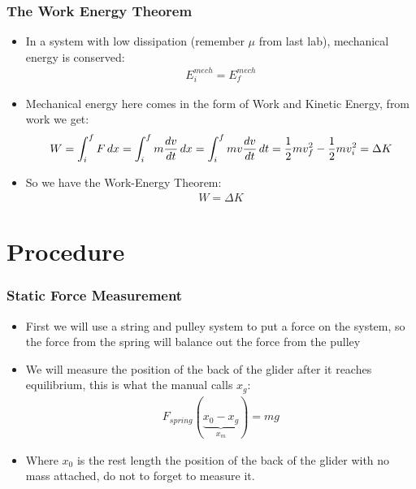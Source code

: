 \documentclass[handout,aspectratio=169]{beamer}
\begin{document}
\begin{frame}
  \frametitle{The Work Energy Theorem}
  \begin{itemize}
  \item In a system with low dissipation (remember $\mu$ from last lab), mechanical energy is conserved:
    \begin{align*}
      E^{mech}_i=E^{mech}_f
    \end{align*}
  \item Mechanical energy here comes in the form of Work and Kinetic Energy, from work we get:
    \begin{align*}
      W=\int_i^fF\dd{x}=\int_i^fm\dv{v}{t}\dd{x}=\int_i^fmv\dv{v}{t}\dd{t}
      =\frac12mv^2_f-\frac12mv^2_i=\Delta K
    \end{align*}
  \item So we have the Work-Energy Theorem:
    \begin{align*}
      W=\Delta K
    \end{align*}
  \end{itemize}
\end{frame}

\section{Procedure}
\begin{frame}
  \frametitle{Static Force Measurement}
  \begin{itemize}
  \item First we will use a string and pulley system to put a force on the system, so the force from the spring will balance out the force from the pulley
  \item We will measure the position of the back of the glider after it reaches equilibrium, this is what the manual calls $x_g$:
    \begin{align*}
      F_{spring}(\underbrace{x_0-x_g}_{x_m})=mg
    \end{align*}
  \item Where $x_0$ is the rest length the position of the back of the glider with no mass attached, do not to forget to measure it.
  \end{itemize}
\end{frame}
\end{document}
